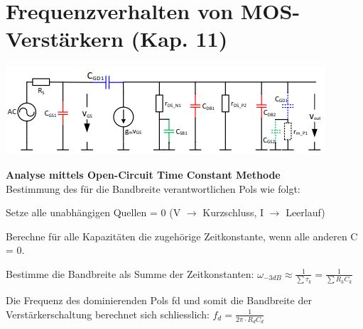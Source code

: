 
\section{Frequenzverhalten von MOS-Verstärkern (Kap. 11)}
\begin{minipage}[c]{0.3\textwidth}
	\includegraphics[width=1\linewidth]{chapters/Frequenzverhalten/images/parasitaere_kapazitaeten}
\end{minipage}
\begin{minipage}[c]{0.5\textwidth}
\textbf{Analyse mittels Open-Circuit Time Constant Methode} \\
Bestimmung des für die Bandbreite verantwortlichen Pols wie folgt:
\begin{compactenum}
	\item Setze alle unabhängigen Quellen = 0 (V $\rightarrow$ Kurzschluss, I $\rightarrow$ Leerlauf)
	\item Berechne für alle Kapazitäten die zugehörige Zeitkonstante, wenn alle anderen C = 0.
	\item Bestimme die Bandbreite als Summe der Zeitkonstanten: $\omega_{-3dB}\approx \frac{1}{\sum\tau_k}=\frac{1}{\sum R_kC_k}$
\end{compactenum}
\end{minipage}
Die Frequenz des dominierenden Pols fd und somit die Bandbreite der Verstärkerschaltung berechnet sich schliesslich: $f_d=\frac{1}{2\pi \cdot R_dC_d}$


